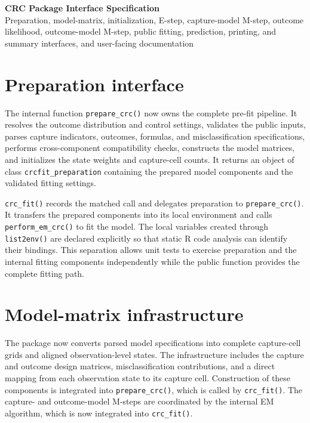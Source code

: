 \documentclass[11pt,letterpaper]{article}
\begin{document}
\begin{center}
  {\Large\bfseries CRC Package Interface Specification}\\[3pt]
  {\large Preparation, model-matrix, initialization, E-step,
  capture-model M-step, outcome likelihood, outcome-model M-step,
  public fitting, prediction, printing, and summary interfaces, and
  user-facing documentation}
\end{center}

\section{Preparation interface}

The internal function \texttt{prepare\_crc()} now owns the complete pre-fit
pipeline. It resolves the outcome distribution and control settings, validates
the public inputs, parses capture indicators, outcomes, formulas, and
misclassification specifications, performs cross-component compatibility
checks, constructs the model matrices, and initializes the state weights and
capture-cell counts. It returns an object of class
\texttt{crcfit\_preparation} containing the prepared model components and the
validated fitting settings.

\texttt{crc\_fit()} records the matched call and delegates preparation to
\texttt{prepare\_crc()}. It transfers the prepared components into its local
environment and calls \texttt{perform\_em\_crc()} to fit the model. The local
variables created through \texttt{list2env()} are
declared explicitly so that static R code analysis can identify their
bindings. This separation allows unit tests to exercise preparation and the
internal fitting components independently while the public function provides
the complete fitting path.

\section{Model-matrix infrastructure}

The package now converts parsed model specifications into complete capture-cell
grids and aligned observation-level states. The infrastructure includes the
capture and outcome design matrices, misclassification contributions, and a
direct mapping from each observation state to its capture cell. Construction
of these components is integrated into \texttt{prepare\_crc()}, which is
called by \texttt{crc\_fit()}. The capture- and outcome-model M-steps are
coordinated by the internal EM algorithm, which is now integrated into
\texttt{crc\_fit()}.
\end{document}
